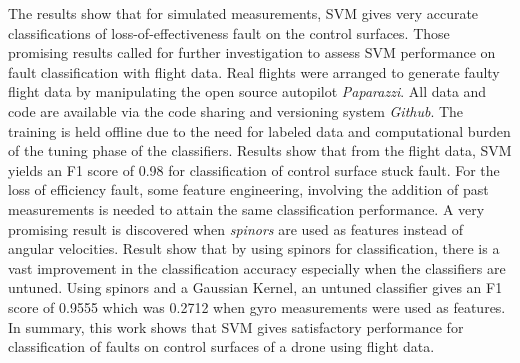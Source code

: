 The results show that for simulated measurements, SVM gives very accurate classifications of loss-of-effectiveness fault on the control surfaces. 
Those promising results called for further investigation to assess SVM performance on fault classification with flight data.
Real flights were arranged to generate faulty flight data by manipulating the open source autopilot \emph{Paparazzi}. 
All data and code are available via the code sharing and versioning system \emph{Github}. 
The training is held offline due to the need for labeled data and computational burden of the tuning phase of the classifiers. 
Results show that from the flight data, SVM yields an F1 score of 0.98 for classification of control surface stuck fault. 
For the loss of efficiency fault, some feature engineering, involving the addition of past measurements is needed to attain the same classification performance. 
A very promising result is discovered when \emph{spinors} are used as features instead of angular velocities. 
Result show that by using spinors for classification, there is a vast improvement in the classification accuracy especially when the classifiers are untuned. Using spinors and a Gaussian Kernel, an untuned classifier gives an F1 score of 0.9555 which was 0.2712 when gyro measurements were used as features.
In summary, this work shows that SVM gives satisfactory performance for classification of faults on control surfaces of a drone using flight data.
